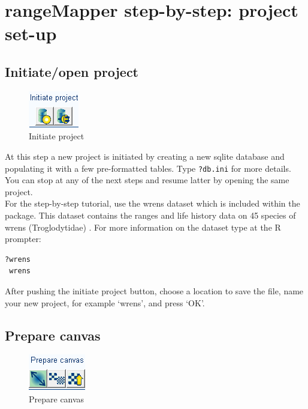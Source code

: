 \documentclass[ a4paper ]{article}
\newenvironment{Rcode}
{\begin{list}{}{\setlength{\leftmargin}{1em}}\item\scriptsize\bfseries}
{\end{list}}
\begin{document}
\section{rangeMapper step-by-step: project set-up}
	\subsection{Initiate/open project}
	\begin{figure}[htbp]
	  \begin{center}
		\includegraphics[width=0.2\linewidth]{fig3}
		\caption{\label{fig:fig3} Initiate project}
	  \end{center}
	\end{figure}
	At this step a new project is initiated by creating a new sqlite database and populating it with a few pre-formatted tables. 
	Type \texttt{?db.ini} for more details. You can stop at any of the next steps and resume latter by opening the same project.
	\\
	For the step-by-step tutorial, use the wrens dataset which is included within the package. This dataset contains the ranges and life history data on 45 species of wrens (Troglodytidae) \cite{ridgely07}. 
For more information on the dataset type at the R prompter:
\begin{Rcode}\begin{verbatim}
?wrens 
 wrens
\end{verbatim}\end{Rcode}
After pushing the initiate project button, choose a location to save the file, name your new project, for example `wrens', and press `OK'.

\subsection{Prepare canvas}
	
	\begin{figure}[htbp]
	  \begin{center}
		\includegraphics[width=0.2\linewidth]{fig4}
		\caption{\label{fig:fig4} Prepare canvas}
	  \end{center}
	\end{figure}
	
\end{document}
